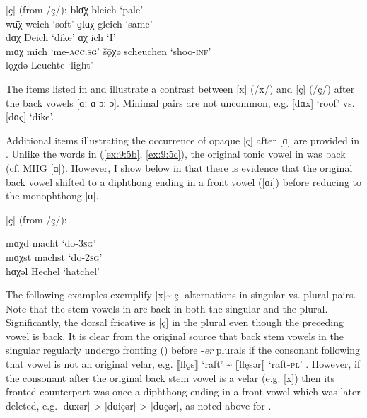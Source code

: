 \ea%
\label{ex:9:5} [ç] (from /ç/):
\ea\label{ex:9:5a} blɑ̄χ  \tab [blɑːç] \tab bleich    \tab ‘pale’ \\
    wɑ̄χ   \tab [vɑːç]  \tab  weich    \tab ‘soft’ 
\ex\label{ex:9:5b} ɡlɑχ  \tab [glɑç]  \tab  gleich   \tab ‘same’ \\
    dɑχ   \tab [dɑç]   \tab Deich     \tab ‘dike’ 
\ex\label{ex:9:5c} ɑχ    \tab [ɑç]    \tab  ich      \tab ‘I’  \\
    mɑχ   \tab [mɑç]   \tab  mich     \tab ‘me-\textsc{acc.sg}’ 
\ex\label{ex:9:5d} šǭχə  \tab [ʃɔːçə] \tab scheuchen \tab ‘shoo-\textsc{inf}’ \\
\ex\label{ex:9:5e} lǫχdə \tab [lɔçtə] \tab Leuchte   \tab ‘light’ 
\z
\z 

The items listed in  and  illustrate a contrast between [x] (/x/) and [ç] (/ç/) after the back vowels [ɑː ɑ ɔː ɔ]. Minimal pairs are not uncommon, e.g. [dɑx] ‘roof’ vs. [dɑç] ‘dike’.

Additional items illustrating the occurrence of opaque [ç] after [ɑ] are provided in . Unlike the words in (\ref{ex:9:5b}, \ref{ex:9:5c}), the original tonic vowel in  was back (cf. \textsc{MHG} [ɑ]). However, I show below in  that there is evidence that the original back vowel shifted to a diphthong ending in a front vowel ([ɑi]) before reducing to the monophthong [ɑ].\largerpage[-1]\pagebreak

\ea%
    \label{ex:9:6} [ç] (from /ç/):\\
    \begin{xlist}
      \sn
    mɑχd  \tab [mɑçt]  \tab macht  \tab ‘do-\textsc{3sg}’ \\
    mɑχst \tab [mɑçst] \tab machst \tab ‘do-\textsc{2sg}’   \\
    hɑχəl \tab [hɑçəl] \tab Hechel \tab ‘hatchel’           \\
    \end{xlist}
\z 

The following examples exemplify [x]{\textasciitilde}[ç] alternations in singular vs. plural pairs. Note that the stem vowels in  are back in both the singular and the plural. Significantly, the dorsal fricative is [ç] in the plural even though the preceding vowel is back. It is clear from the original source that back stem vowels in the singular regularly undergo fronting () before -\textit{er} plurals if the consonant following that vowel is not an original velar, e.g. ⟦flǫs⟧ ‘raft’ {\textasciitilde} ⟦flęsər⟧ ‘raft-\textsc{pl}’ \citep[123--124]{Kroh1915}. However, if the consonant after the original back stem vowel is a velar (e.g. [x]) then its fronted counterpart was once a diphthong ending in a front vowel which was later deleted, e.g. [dɑxər] > [dɑiçər] > [dɑçər], as noted above for .

